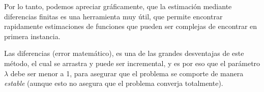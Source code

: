\documentclass[12pt,letterpaper]{article}
\begin{document}
Por lo tanto, podemos apreciar gráficamente, que la estimación mediante diferencias finitas es una herramienta muy útil, que permite encontrar rapidamente estimaciones de funciones que pueden ser complejas de encontrar en primera instancia.

Las diferencias (error matemático), es una de las grandes desventajas de este método, el cual se arrastra y puede ser incremental, y es por eso que el parámetro $\lambda$ debe ser menor a 1, para asegurar que el problema se comporte de manera \textit{estable} (aunque esto no asegura que el problema converja totalmente).
\end{document}
